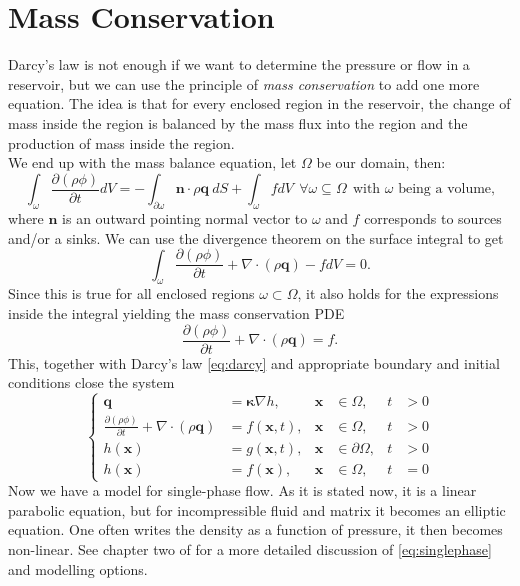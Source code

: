 \documentclass[../Main/main.tex]{subfiles}
\begin{document}
\section*{Mass Conservation}
Darcy's law is not enough if we want to determine the pressure or flow in a reservoir, but we can use the principle of \emph{mass conservation} to add one more equation. 
The idea is that for every enclosed region in the reservoir, the change of mass inside the region is balanced by the mass flux into the region and the production of mass inside the region.
\\
We end up with the mass balance equation, let $\Omega$ be our domain, then:
\begin{equation*}
\int_{\omega}\frac{\partial (\rho \phi) }{\partial t} dV= -\int_{\partial\omega}\bm{n}\cdot\rho\bm{q} \ dS+\int_{\omega} f dV \ \ \forall \omega \subseteq \Omega \ \ \text{with }\omega \text{ being a volume,}
\end{equation*}
where $\bm{n}$ is an outward pointing normal vector to $\omega$ and $f$ corresponds to sources and/or a sinks. We can use the divergence theorem on the surface integral to get
\begin{equation*}
\int_{\omega}\frac{\partial (\rho \phi) }{\partial t} + \nabla \cdot(\rho \bm{q}) -fdV= 0.
\end{equation*}
Since this is true for all enclosed regions $\omega\subset \Omega$, it also holds for the expressions inside the integral yielding the mass conservation PDE
\begin{equation*}
\frac{\partial (\rho \phi) }{\partial t} + \nabla \cdot (\rho \bm{q}) = f.
\end{equation*}
This, together with Darcy's law \eqref{eq:darcy} and appropriate boundary and initial conditions close the system
\begin{equation}\label{eq:singlephase}
\left \{ \begin{aligned}
	\bm{q} &=\bm{\kappa} \nabla h, & \bm{x} &\in \Omega,  &t &>0 \\
	\frac{\partial (\rho \phi) }{\partial t} + \nabla \cdot(\rho \bm{q}) &=f(\bm{x},t), & \bm{x} &\in \Omega, & t &>0 \\
	h(\bm{x}) &= g(\bm{x},t), &\bm{x} &\in \partial \Omega,&t &>0 \\
	h(\bm{x}) &= f(\bm{x}), & 	\bm{x} &\in \Omega,  &	t &=0 
\end{aligned}\right. 
\end{equation}
Now we have a model for single-phase flow. As it is stated now, it is a linear parabolic equation, but for incompressible fluid and matrix it becomes an elliptic equation. One often writes the density as a function of pressure, it then becomes non-linear. See chapter two of \cite{Nordbotten} for a more detailed discussion of \eqref{eq:singlephase} and modelling options.
\end{document}
